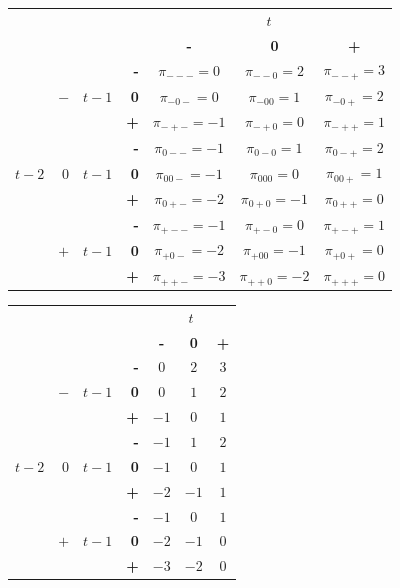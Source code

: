 \documentclass{article}[]
\begin{document}
\begin{center}
\begin{tabular}{r | r | r | r | c c c | }
 \multicolumn{3}{r}{} & \multicolumn{1}{r}{} &	\multicolumn{3}{c}{$t$} \\ \cline{5-7}
 \multicolumn{3}{r}{} & 		& \textbf{-} & \textbf{0} & \textbf{+} \\ \cline{2-2} \cline{4-7}
&&& \textbf{-}              & $\pi_{---}=0$ & $\pi_{--0}=2$ & $\pi_{--+}=3$ \\ 
&$-$ &$t-1$&\textbf{0}      & $\pi_{-0-}=0$	& $\pi_{-00}=1$ & $\pi_{-0+}=2$	\\
&&&\textbf{+}               & $\pi_{-+-}=-1$& $\pi_{-+0}=0$	& $\pi_{-++}=1$ \\ \cline{2-2} \cline{4-7}
&&&\textbf{-}               & $\pi_{0--}=-1$	& $\pi_{0-0}=1$	    & $\pi_{0-+}=2$ \\ 
$t-2$&$0$&$t-1$&\textbf{0}  & $\pi_{00-}=-1$	& $\pi_{000}=0$	    & $\pi_{00+}=1$	\\
&&&\textbf{+}               & $\pi_{0+-}=-2$	& $\pi_{0+0}=-1$    & $\pi_{0++}=0$ \\ \cline{2-2} \cline{4-7}
&&&\textbf{-}               & $\pi_{+--}=-1$	& $\pi_{+-0}=0$	    & $\pi_{+-+}=1$ \\ 
&$+$   &$t-1$ & \textbf{0}  & $\pi_{+0-}=-2$	& $\pi_{+00}=-1$    & $\pi_{+0+}=0$	\\
&&&\textbf{+}               & $\pi_{++-}=-3$	& $\pi_{++0}=-2$    & $\pi_{+++}=0$ \\ \cline{2-2} \cline{4-7}
		
\end{tabular}    
\end{center}



\begin{center}
\begin{tabular}{r | r | r | r | c c c | }
 \multicolumn{3}{r}{} & \multicolumn{1}{r}{} &	\multicolumn{3}{c}{$t$} \\ \cline{5-7}
 \multicolumn{3}{r}{} & 		& \textbf{-} & \textbf{0} & \textbf{+} \\ \cline{2-2} \cline{4-7}
&&& \textbf{-}              & $0$	& $2$	& $3$ \\ 
& $-$ &$t-1$ & \textbf{0}   & $0$	& $1$	& $2$	\\
&&& \textbf{+}              & $-1$ & $0$	& $1$ \\ \cline{2-2} \cline{4-7}
&&& \textbf{-}              & $-1$ & $1$	& $2$ \\ 
$t-2$&$0$&$t-1$&\textbf{0}  & $-1$	& $0$	& $1$	\\
&&&    \textbf{+}           & $-2$ & $-1$	& $1$ \\ \cline{2-2} \cline{4-7}
&&&    \textbf{-}           & $-1$ & $0$	& $1$ \\ 
&$+$   &$t-1$ & \textbf{0}  & $-2$	& $-1$	& $0$	\\
&&& \textbf{+}              & $-3$	& $-2$	& $0$ \\ \cline{2-2} \cline{4-7}
\end{tabular}    
\end{center}
\end{document}
